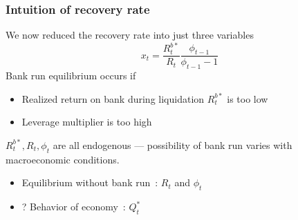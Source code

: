 \begin{frame}
    \frametitle{Intuition of recovery rate}

    We now reduced the recovery rate into just three variables
    \begin{equation*}
        x_t = \frac{R^{b*}_t}{R_t}\frac{\phi_{t-1}}{\phi_{t-1} - 1 }
    \end{equation*}
    \vspace{2em}
    Bank run equilibrium occurs if 
    \begin{itemize}
        \item Realized return on bank during liquidation $R^{b*}_t$ is too low
        \item Leverage multiplier is too high 
    \end{itemize}

    $R^{b*}_t, R_t, \phi_t$ are all endogenous --- possibility of bank run varies with macroeconomic conditions.
    \begin{itemize}
        \item Equilibrium without bank run~: $R_t$ and $\phi_t$
        \item ? Behavior of economy~: $Q^*_t$
    \end{itemize}

\end{frame}

